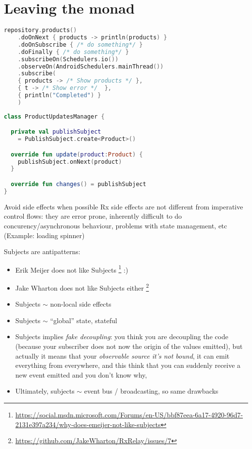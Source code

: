 \documentclass[10pt]{beamer}
\begin{document}
\section{Leaving the monad}
\begin{frame}[fragile]
\begin{lstlisting}[language=Kotlin, basicstyle=\ttfamily]
repository.products()
    .doOnNext { products -> println(products) }
    .doOnSubscribe { /* do something*/ }
    .doFinally { /* do something*/ }
    .subscribeOn(Schedulers.io())
    .observeOn(AndroidSchedulers.mainThread())
    .subscribe(
    { products -> /* Show products */ },
    { t -> /* Show error */  },
    { println("Completed") }
    )
\end{lstlisting}
\end{frame}

\begin{frame}[fragile]
\begin{lstlisting}[language=Kotlin, basicstyle=\ttfamily]
class ProductUpdatesManager {

  private val publishSubject
 	= PublishSubject.create<Product>()

  override fun update(product:Product) {
    publishSubject.onNext(product)
  }

  override fun changes() = publishSubject
}
\end{lstlisting}
\end{frame}
\begin{frame}
	\begin{alertblock}
	{Avoid side effects when possible}
	Rx side effects are not different from imperative control flows: they are error prone, inherently difficult to do concurency/asynchronous behaviour, problems with state management, etc (Example: loading spinner) 
	\end{alertblock}
\end{frame}

\begin{frame}
	Subjects are antipatterns:
	\begin{itemize}
		\item Erik Meijer does not like Subjects%
\footnote{\url{https://social.msdn.microsoft.com/Forums/en-US/bbf87eea-6a17-4920-96d7-2131e397a234/why-does-emeijer-not-like-subjects}} :)
		\item  Jake Wharton does not like Subjects either%
\footnote{\url{https://github.com/JakeWharton/RxRelay/issues/7}}
		\item  Subjects $\sim$ non-local side effects%
		\item  Subjects $\sim$ ``global'' state, stateful 
		\item  Subjects implies \emph{fake decoupling}: you think you are decoupling the code (because your subscriber does not now the origin of the values emitted), but actually it means that your \emph{observable source it's not bound}, it can emit everything from everywhere, and this think that you can suddenly receive a new event emitted and you don’t know why, 
		\item Ultimately, subjects $\sim$ event bus / broadcasting, so same drawbacks
	\end{itemize}
\end{frame}
\end{document}
